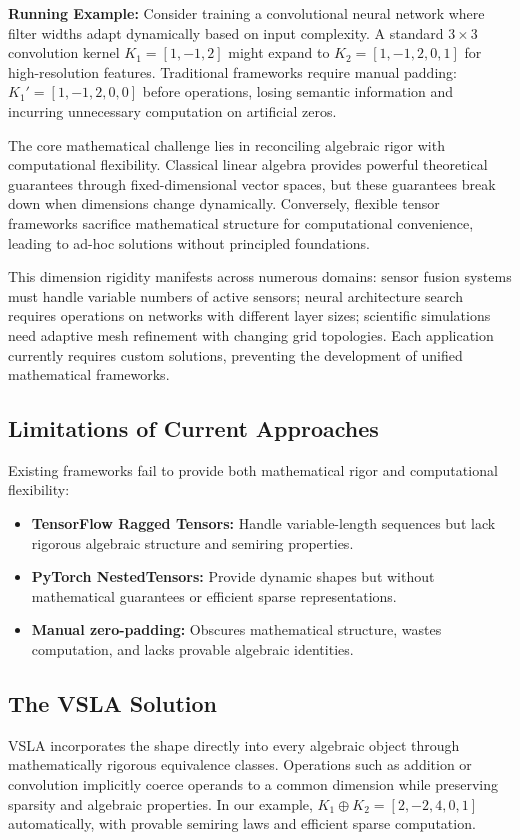 \documentclass[11pt]{article}
\begin{document}
\vspace{0.5em}
\textbf{Running Example:} Consider training a convolutional neural network where filter widths adapt dynamically based on input complexity. A standard $3 \times 3$ convolution kernel $K_1 = [1, -1, 2]$ might expand to $K_2 = [1, -1, 2, 0, 1]$ for high-resolution features. Traditional frameworks require manual padding: $K_1' = [1, -1, 2, 0, 0]$ before operations, losing semantic information and incurring unnecessary computation on artificial zeros.

The core mathematical challenge lies in reconciling algebraic rigor with computational flexibility. Classical linear algebra provides powerful theoretical guarantees through fixed-dimensional vector spaces, but these guarantees break down when dimensions change dynamically. Conversely, flexible tensor frameworks sacrifice mathematical structure for computational convenience, leading to ad-hoc solutions without principled foundations.

This dimension rigidity manifests across numerous domains: sensor fusion systems must handle variable numbers of active sensors; neural architecture search requires operations on networks with different layer sizes; scientific simulations need adaptive mesh refinement with changing grid topologies. Each application currently requires custom solutions, preventing the development of unified mathematical frameworks.

\subsection{Limitations of Current Approaches}
\label{sec:limitations}

Existing frameworks fail to provide both mathematical rigor and computational flexibility:

\begin{itemize}[leftmargin=1.5em]
\item \textbf{TensorFlow Ragged Tensors:} Handle variable-length sequences but lack rigorous algebraic structure and semiring properties.
\item \textbf{PyTorch NestedTensors:} Provide dynamic shapes but without mathematical guarantees or efficient sparse representations.
\item \textbf{Manual zero-padding:} Obscures mathematical structure, wastes computation, and lacks provable algebraic identities.
\end{itemize}

\subsection{The VSLA Solution}
VSLA incorporates the shape directly into every algebraic object through mathematically rigorous equivalence classes.  Operations such as addition or convolution implicitly coerce operands to a common dimension while preserving sparsity and algebraic properties. In our example, $K_1 \oplus K_2 = [2, -2, 4, 0, 1]$ automatically, with provable semiring laws and efficient sparse computation.
\end{document}
